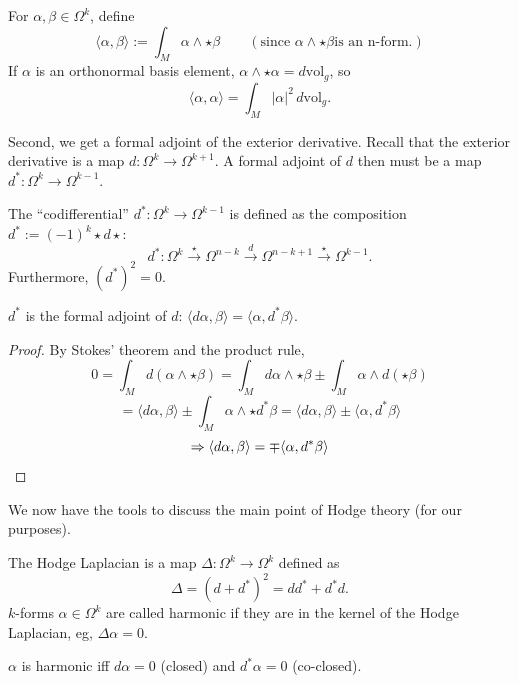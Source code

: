 \documentclass[main]{subfiles}
\begin{document}
\begin{definition}
For $\alpha,\beta \in \Omega^k$, define
\[
\langle \alpha,\beta\rangle := \int_M \alpha \wedge \star\beta \qquad (\text{since } \alpha\wedge\star\beta \text{is an n-form.})
\]
If $\alpha$ is an orthonormal basis element, $\alpha\wedge\star\alpha = d\mathrm{vol}_g$, so
\[
\langle \alpha,\alpha\rangle = \int_M |\alpha|^2\, d\mathrm{vol}_g.
\]
\end{definition}

Second, we get a formal adjoint of the exterior derivative. Recall that the exterior derivative is a map $d : \Omega^k \to \Omega^{k+1}$.
A formal adjoint of $d$ then must be a map $d^\ast : \Omega^k \to \Omega^{k-1}$.

\begin{definition}
The ``codifferential'' $d^\ast : \Omega^k \to \Omega^{k-1}$ is defined as the composition $d^\ast := (-1)^k \star d \star$:
\[
d^\ast : \Omega^k \xrightarrow{\star} \Omega^{n-k} \xrightarrow{d} \Omega^{n-k+1} \xrightarrow{\star} \Omega^{k-1}.
\]
Furthermore, $(d^\ast)^2 = 0$.
\end{definition}

\begin{lemma}
$d^\ast$ is the formal adjoint of $d$: $\langle d\alpha,\beta\rangle = \langle \alpha,d^\ast\beta\rangle$.
\end{lemma}

\begin{proof}
By Stokes' theorem and the product rule,
\[
0 = \int_M d(\alpha\wedge\star\beta) = \int_M d\alpha\wedge\star\beta \pm \int_M \alpha\wedge d(\star\beta)
\]
\[
= \langle d\alpha,\beta\rangle \pm \int_M \alpha \wedge \star d^\ast \beta = \langle d\alpha,\beta\rangle \pm \langle \alpha,d^\ast\beta\rangle
\]
\[
\Rightarrow \langle d\alpha,\beta\rangle = \mp \langle \alpha,d^\ast\beta\rangle \qedhere
\]
\end{proof}

We now have the tools to discuss the main point of Hodge theory (for our purposes).

\begin{definition}
The Hodge Laplacian is a map $\Delta : \Omega^k \to \Omega^k$ defined as
\[
\Delta = (d+d^\ast)^2 = dd^\ast + d^\ast d.
\]
$k$-forms $\alpha \in \Omega^k$ are called harmonic if they are in the kernel of the Hodge Laplacian, eg, $\Delta\alpha = 0$.

\end{definition}


\begin{lemma}
$\alpha$ is harmonic iff $d\alpha = 0$ (closed) and $d^\ast\alpha = 0$ (co-closed).
\end{lemma}
\end{document}
